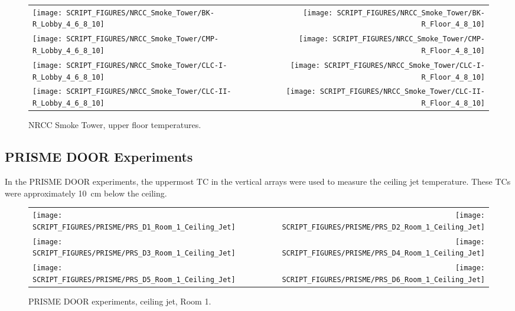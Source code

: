 \begin{figure}[p]
\begin{tabular*}{\textwidth}{l@{\extracolsep{\fill}}r}
\texttt{[image: SCRIPT\_FIGURES/NRCC\_Smoke\_Tower/BK-R\_Lobby\_4\_6\_8\_10]} &
\texttt{[image: SCRIPT\_FIGURES/NRCC\_Smoke\_Tower/BK-R\_Floor\_4\_8\_10]} \\
\texttt{[image: SCRIPT\_FIGURES/NRCC\_Smoke\_Tower/CMP-R\_Lobby\_4\_6\_8\_10]} &
\texttt{[image: SCRIPT\_FIGURES/NRCC\_Smoke\_Tower/CMP-R\_Floor\_4\_8\_10]} \\
\texttt{[image: SCRIPT\_FIGURES/NRCC\_Smoke\_Tower/CLC-I-R\_Lobby\_4\_6\_8\_10]} &
\texttt{[image: SCRIPT\_FIGURES/NRCC\_Smoke\_Tower/CLC-I-R\_Floor\_4\_8\_10]} \\
\texttt{[image: SCRIPT\_FIGURES/NRCC\_Smoke\_Tower/CLC-II-R\_Lobby\_4\_6\_8\_10]} &
\texttt{[image: SCRIPT\_FIGURES/NRCC\_Smoke\_Tower/CLC-II-R\_Floor\_4\_8\_10]}
\end{tabular*}
\caption[NRCC Smoke Tower, upper floor temperatures]{NRCC Smoke Tower, upper floor temperatures.}
\label{NRCC_Smoke_Tower_Upper_Floors}
\end{figure}


\clearpage


\subsection{PRISME DOOR Experiments}

In the PRISME DOOR experiments, the uppermost TC in the vertical arrays were used to measure the ceiling jet temperature. These TCs were approximately 10~cm below the ceiling.

\begin{figure}[!h]
\begin{tabular*}{\textwidth}{l@{\extracolsep{\fill}}r}
\texttt{[image: SCRIPT\_FIGURES/PRISME/PRS\_D1\_Room\_1\_Ceiling\_Jet]} &
\texttt{[image: SCRIPT\_FIGURES/PRISME/PRS\_D2\_Room\_1\_Ceiling\_Jet]} \\
\texttt{[image: SCRIPT\_FIGURES/PRISME/PRS\_D3\_Room\_1\_Ceiling\_Jet]} &
\texttt{[image: SCRIPT\_FIGURES/PRISME/PRS\_D4\_Room\_1\_Ceiling\_Jet]} \\
\texttt{[image: SCRIPT\_FIGURES/PRISME/PRS\_D5\_Room\_1\_Ceiling\_Jet]} &
\texttt{[image: SCRIPT\_FIGURES/PRISME/PRS\_D6\_Room\_1\_Ceiling\_Jet]}
\end{tabular*}
\caption{PRISME DOOR experiments, ceiling jet, Room 1.}
\label{PRISME_Ceiling_Jet_Room_1}
\end{figure}

